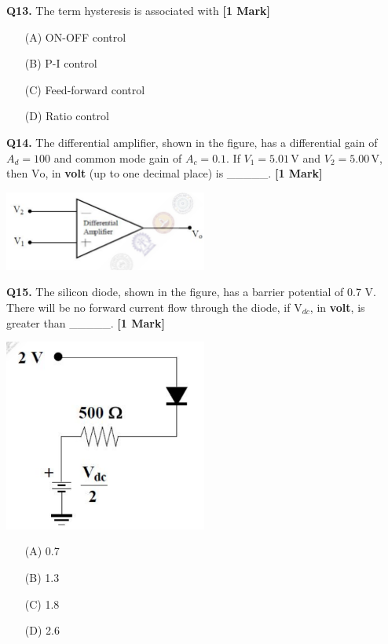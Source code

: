 \documentclass[11pt]{article}
\newcommand{\questiona}[2]{
    \noindent\textbf{Q#2.} #1 \hfill \textbf{[1 Mark]}
}
\begin{document}
\questiona{The term hysteresis is associated with}{13}
\begin{enumerate}
    \item[(A)] ON-OFF control  
    \item[(B)] P-I control  
    \item[(C)] Feed-forward control  
    \item[(D)] Ratio control  
\end{enumerate}
\vspace{0.5cm}

\questiona{The differential amplifier, shown in the figure, has a differential gain of \( A_d = 100 \) and common mode gain of \( A_c = 0.1 \). If \( V_1 = 5.01 \, \text{V} \) and \( V_2 = 5.00 \, \text{V} \), then \( \text{Vo} \), in \textbf{volt} (up to one decimal place) is \_\_\_\_\_.}{14}
\begin{center}
\includegraphics[width=0.5\textwidth]{figures/14.png}
\end{center}
\vspace{0.5cm}

\questiona{The silicon diode, shown in the figure, has a barrier potential of 0.7 V. There will be no forward current flow through the diode, if \( \text{V}_{dc} \), in \textbf{volt}, is greater than \_\_\_\_\_.}{15}
\begin{center}
\includegraphics[width=0.5\textwidth]{figures/15.png}
\end{center}
\begin{enumerate}
    \item[(A)] 0.7  
    \item[(B)] 1.3  
    \item[(C)] 1.8  
    \item[(D)] 2.6  
\end{enumerate}
\vspace{0.5cm}
\end{document}
